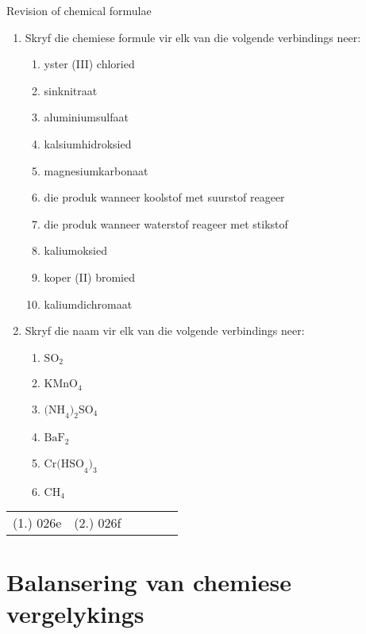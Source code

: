 \begin{exercises}{Revision of chemical formulae}
{
\begin{enumerate}[noitemsep, label=\textbf{\arabic*}.]
    \item Skryf die chemiese formule vir elk van die volgende verbindings neer:
    \begin{enumerate}[noitemsep, label=\textbf{\alph*}. ]
        \item yster (III) chloried
        \item sinknitraat
        \item aluminiumsulfaat
        \item kalsiumhidroksied
        \item magnesiumkarbonaat
        \item die produk wanneer koolstof met suurstof reageer
        \item die produk wanneer waterstof reageer met stikstof
        \item kaliumoksied
        \item koper (II) bromied
        \item kaliumdichromaat
    \end{enumerate}
    \item Skryf die naam vir elk van die volgende verbindings neer:
    \begin{enumerate}[noitemsep, label=\textbf{\alph*}. ]
        \item $\text{SO}_2$
        \item $\text{KMnO}_4$
        \item $\text{(NH}_{4}\text{)}_{2}\text{SO}_{4}$
        \item $\text{BaF}_2$
        \item $\text{Cr(HSO}_{4}\text{)}_{3}$
        \item $\text{CH}_{4}$
    \end{enumerate}
\end{enumerate}
\par \practiceinfo
\par \begin{tabular}[h]{cccccc}
(1.)	026e	&
(2.)	026f	&
\end{tabular}
}
\end{exercises}

\section{Balansering van chemiese vergelykings}
